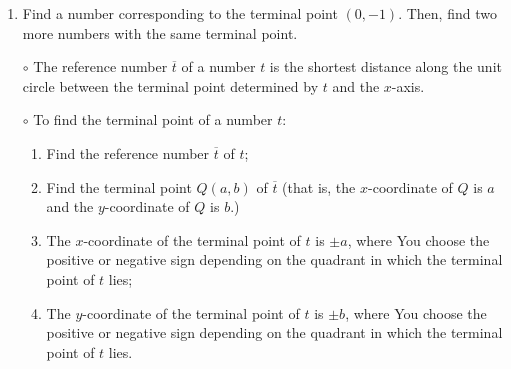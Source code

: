 \documentclass[12pt,dvipsnames]{article}
\begin{document}
\begin{enumerate}[label= {\bf  \arabic*:}]
\begin{enumerate}
\begin{multicols}{5}
\begin{enumerate}
					\end{enumerate}	
				\end{multicols}
	\end{enumerate}
	
	\item Find a number corresponding to the terminal point $(0,-1)$. Then, find two more numbers with the same terminal point.
\end{enumerate}
\begin{mdframed}[style=testframe]
	\begin{itemize}
		\item[$\circ$] The reference number $\overline{t}$ of a number $t$ is the shortest distance along the unit circle between the terminal point determined by $t$ and the $x$-axis.
		
			\item[$\circ$]  To find the terminal point of a number $t$:
			\begin{enumerate}
				\item Find the reference number $\overline{t}$  of $t$;
				\item Find the terminal point $Q(a,b)$ of $\overline{t}$ (that is, the $x$-coordinate of $Q$ is $a$ and the $y$-coordinate of $Q$ is $b$.)
				\item The $x$-coordinate of the terminal point of $t$ is $\pm a$, where You choose the positive or negative sign depending on the quadrant in which the terminal point of $t$ lies;
					\item The $y$-coordinate of the terminal point of $t$ is $\pm b$, where You choose the positive or negative sign depending on the quadrant in which the terminal point of $t$ lies.
			\end{enumerate}
		
	\end{itemize}
	
\end{mdframed}
\end{document}
